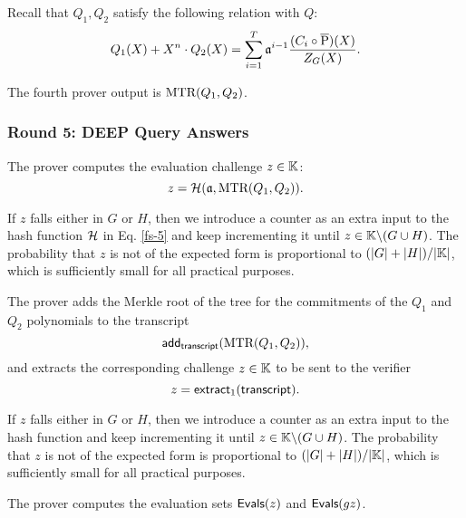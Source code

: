 Recall that $Q_1,Q_2$ satisfy the following relation with $Q$:
\begin{equation}\label{eq:ali-check2}
  Q_1(X) + X^n \cdot Q_2(X) = \sum_{i=1}^T \mathfrak{a}^{i-1} \frac{(C_i \circ \overline{\text{P}})(X)}{Z_G(X)}.
\end{equation}

The fourth prover output is $\text{MTR}(Q_1,Q_2)$.


\subsubsection*{Round 5: DEEP Query Answers}

\ifNOPOLYGON
The prover computes the evaluation challenge $z \in \mathbb{K}$: 
\begin{equation}\label{fs-5}
  z = \mathcal{H}(\mathfrak{a},\text{MTR}(Q_1,Q_2)).
\end{equation}

If $z$ falls either in $G$ or $H$, then we introduce a counter as an extra input to the hash function $\mathcal{H}$ in Eq. \eqref{fs-5} and keep incrementing it until $z \in \mathbb{K} \backslash (G \cup H)$. The probability that $z$ is not of the expected form is proportional to $(|G|+|H|)/|\mathbb{K}|$, which is sufficiently small for all practical purposes.
\fi

\ifPOLYGON
The prover adds the Merkle root of the tree for the commitments of the $Q_1$ and $Q_2$ polynomials to the transcript
\[
\textsf{add}_{\textsf{transcript}}(\text{MTR}(Q_1, Q_2)),
\]
and extracts the corresponding challenge $z \in \mathbb{K}$ to be sent to the verifier
\[
z = \mathsf{extract}_{1}(\textsf{transcript}).
\]

If $z$ falls either in $G$ or $H$, then we introduce a counter as an extra input to the hash function and keep incrementing it until $z \in \mathbb{K} \backslash (G \cup H)$. The probability that $z$ is not of the expected form is proportional to $(|G|+|H|)/|\mathbb{K}|$, which is sufficiently small for all practical purposes.
\fi

The prover computes the evaluation sets $\textsf{Evals}(z)$ and $\textsf{Evals}(gz)$.

